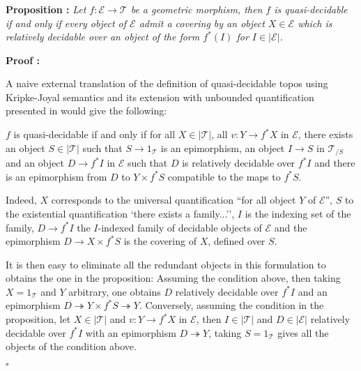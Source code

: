 \documentclass[a4paper]{article}
\newcommand{\Ecal}{\mathcal{E}}
\newcommand{\Tcal}{\mathcal{T}}
\newcommand{\block}[1]
{

\par \subsubsection{} #1

\bigskip}
\newcommand{\Prop}[1]
	{

	\bigskip
	
	\textbf{Proposition : }{\itshape #1}
		
	\bigskip
	
	}
\newcommand{\Dem}[1]{
	
	\smallskip
	
	\textbf{Proof : } \par
	 {#1} $\square$
	 
	 \bigskip
}
\begin{document}
\block{\Prop{Let $f : \Ecal \rightarrow \Tcal$ be a geometric morphism, then $f$ is quasi-decidable if and only if every object of $\Ecal$ admit a covering by an object $X \in \Ecal$ which is relatively decidable over an object of the form $f^*(I)$ for $I \in |\Ecal|$. }

\Dem{A naive external translation of the definition of quasi-decidable topos using Kripke-Joyal semantics and its extension with unbounded quantification presented in \cite{shulman2010stack} would give the following:

$f$ is quasi-decidable if and only if for all $X \in |\Tcal|$, all $v : Y \rightarrow f^* X$ in $\Ecal$, there exists an object $ S \in |\Tcal|$ such that $S \rightarrow 1_{\Tcal}$ is an epimorphism, an object $I \rightarrow S$ in $\Tcal_{/S}$ and an object $D \rightarrow f^* I$ in $\Ecal$ such that $D$ is relatively decidable over $f^* I$ and there is an epimorphism from $D$ to $Y \times f^* S$ compatible to the maps to $f^* S$.


Indeed, $X$ corresponds to the universal quantification ``for all object $Y$ of $\Ecal$'', $S$ to the existential quantification `there exists a family...'', $I$ is the indexing set of the family, $D \rightarrow f^* I$ the $I$-indexed family of decidable objects of $\Ecal$ and the epimorphism $D \rightarrow X \times f^* S$ is the covering of $X$, defined over $S$. 

It is then easy to eliminate all the redundant objects in this formulation to obtains the one in the proposition: Assuming the condition above, then taking $X=1_{\Tcal}$ and $Y$ arbitrary, one obtains $D$ relatively decidable over $f^* I$ and an epimorphism $D \twoheadrightarrow Y \times f^* S \twoheadrightarrow Y$. Conversely, assuming the condition in the proposition, let $X \in |\Tcal|$ and $v:Y \rightarrow f^*X$ in $\Ecal$, then $I \in |\Tcal|$ and $D \in |\Ecal|$ relatively decidable over $f^*I$ with an epimorphism $D \twoheadrightarrow Y$, taking $S=1_{\Tcal}$ gives all the objects of the condition above.
}

}
\end{document}
